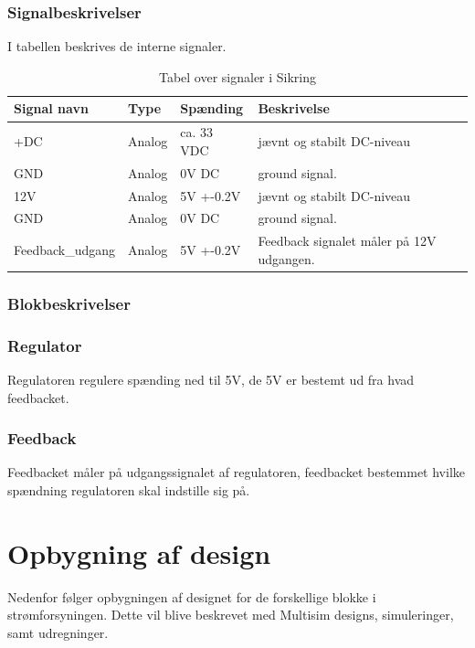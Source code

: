 \subsubsection{Signalbeskrivelser}
I tabellen beskrives de interne signaler.
\begin{table}[H]
\begin{tabular}{|p{3cm}|p{3cm}|p{3cm}|p{4.5cm}|} \hline
\cellcolor[gray]{0.85}Signal navn& \cellcolor[gray]{0.85}Type &\cellcolor[gray]{0.85}Spænding&\cellcolor[gray]{0.85}Beskrivelse\\ \hline
+DC & Analog & ca. 33 VDC & jævnt og stabilt DC-niveau\\  \hline
GND  & Analog & 0V DC & ground signal. \\  \hline
12V & Analog & 5V +-0.2V & jævnt og stabilt DC-niveau\\ \hline
GND & Analog & 0V DC & ground signal.\\ \hline
Feedback\_udgang & Analog & 5V +-0.2V & Feedback signalet måler på 12V udgangen.\\ \hline
\end{tabular}
\caption{Tabel over signaler i Sikring}
\label{table:udglatning}
\end{table}
\subsubsection{Blokbeskrivelser}
\subsubsection{Regulator}
Regulatoren regulere spænding ned til 5V, de 5V er bestemt ud fra hvad feedbacket. 
\subsubsection{Feedback}
Feedbacket måler på udgangssignalet af regulatoren, feedbacket bestemmet hvilke spændning regulatoren skal indstille sig på.
\newpage
\section{Opbygning af design}
Nedenfor følger opbygningen af designet for de forskellige blokke i strømforsyningen. Dette vil blive beskrevet med Multisim designs, simuleringer, samt udregninger. 

